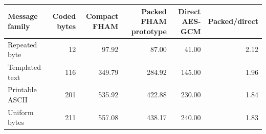 \begin{tabular}{lrrrrr}
\toprule
\textbf{Message family} & \textbf{Coded bytes} & \textbf{Compact FHAM} & \textbf{Packed FHAM prototype} & \textbf{Direct AES-GCM} & \textbf{Packed/direct} \\
\midrule
Repeated byte & 12 & 97.92 & 87.00 & 41.00 & 2.12 \\
Templated text & 116 & 349.79 & 284.92 & 145.00 & 1.96 \\
Printable ASCII & 201 & 535.92 & 422.88 & 230.00 & 1.84 \\
Uniform bytes & 211 & 557.08 & 438.17 & 240.00 & 1.83 \\
\bottomrule
\end{tabular}
